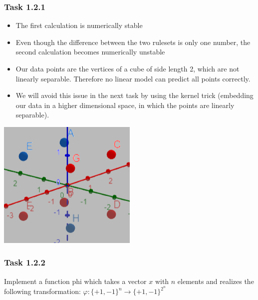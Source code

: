 \documentclass[10pt,aspectratio=169,handout]{beamer}
\begin{document}
\begin{frame}
    \frametitle{Task 1.2.1}
    \begin{minipage}{0.65\textwidth}
        \begin{itemize}
            \item The first calculation is numerically stable
            \\[5mm]
            \item Even though the difference between the two rulesets is only one number, the second calculation becomes numerically unstable
            \\[5mm]
            \item Our data points are the vertices of a cube of side length 2, which are not linearly separable. Therefore no linear model can 
                predict all points correctly. 
            \\[5mm]
            \item We will avoid this issue in the next task by using the kernel trick (embedding our data 
                in a higher dimensional space, in which the points are linearly separable).
        \end{itemize}
    \end{minipage}
    \begin{minipage}{0.25\textwidth}
        \includegraphics[scale=0.8]{images/lin_sep.png}
    \end{minipage}
\end{frame}

\begin{frame}
    \frametitle{Task 1.2.2}
    Implement a function phi which takes a vector $x$ with $n$ elements and realizes the following transformation:
    $\varphi : \{+1, -1\}^n \to \{+1, -1\}^{2^n} $
    \inputminted[bgcolor=LightGray,fontsize=\small]{python}{phi.py}
\end{frame}
\end{document}
